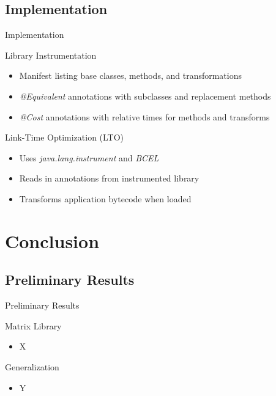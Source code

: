 \documentclass{beamer}
\begin{document}
\subsection{Implementation}
\begin{frame}{Implementation}
  \begin{block}{Library Instrumentation}
    \begin{itemize}
    \item Manifest listing base classes, methods, and transformations
    \item {\it @Equivalent} annotations with subclasses and replacement methods
    \item {\it @Cost} annotations with relative times for methods and transforms
    \end{itemize}
  \end{block}
\pause
  \begin{block}{Link-Time Optimization (LTO)}
    \begin{itemize}
    \item Uses {\it java.lang.instrument} and {\it BCEL}
    \item Reads in annotations from instrumented library
    \item Transforms application bytecode when loaded
    \end{itemize}
  \end{block}
\end{frame}

\section{Conclusion}

\subsection{Preliminary Results} %
\begin{frame}{Preliminary Results}
  \begin{block}{Matrix Library}
    \begin{itemize}
    \item X
    \end{itemize}
  \end{block}
\pause
  \begin{block}{Generalization}
    \begin{itemize}
    \item Y
    \end{itemize}
  \end{block}
\end{frame}
\end{document}
